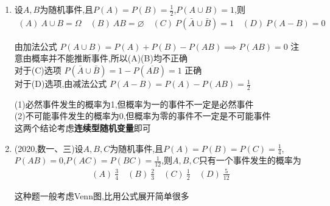 \documentclass[12pt, a4paper, oneside, UTF8]{ctexbook}
\begin{document}
\begin{enumerate}[label=\arabic*.]
    \item 设$A,B$为随机事件,且$P(A)=P(B)=\frac{1}{2}$,$P(A\cup B)=1$,则
    \begin{align*}
        (A)\ A\cup B=\Omega \quad (B)\ AB=\varnothing \quad (C)\ P(\bar{A}\cup\bar{B})=1 \quad (D)\ P(A-B)=0
    \end{align*}

    \begin{solution}
    \color{blue}
    由加法公式
    $P(A\cup B) = P(A) + P(B) - P(AB)\implies P(AB) = 0$ 
    \newline
    注意由概率并不能推断事件,所以(A)(B)均不正确 \\
    对于(C)选项 $P(\bar{A}\cup\bar{B}) = 1 - P(\overline{AB}) = 1$ 正确 \\
    对于(D)选项,由减法公式 $P(A-B) = P(A) - P(AB) = \frac{1}{2}$
    \end{solution}
    
    \begin{tcolorbox}[title=总结]
        (1)必然事件发生的概率为1,但概率为一的事件不一定是必然事件  \\
        (2)不可能事件发生的概率为0,但概率为零的事件不一定是不可能事件 \\
        这两个结论考虑\textbf{连续型随机变量}即可
    \end{tcolorbox}

    \item (2020,数一、三)设$A,B,C$为随机事件,且$P(A)=P(B)=P(C)=\frac{1}{4}$,$P(AB)=0$,$P(AC)=P(BC)=\frac{1}{12}$,则$A,B,C$只有一个事件发生的概率为
    \begin{align*}
        (A)\ \frac{3}{4} \quad (B)\ \frac{2}{3} \quad (C)\ \frac{1}{2} \quad (D)\ \frac{5}{12}
    \end{align*}
    \begin{solution}
    \color{blue}
    这种题一般考虑Venn图,比用公式展开简单很多
    \begin{center}
\end{center}
\end{solution}
\end{enumerate}
\end{document}

